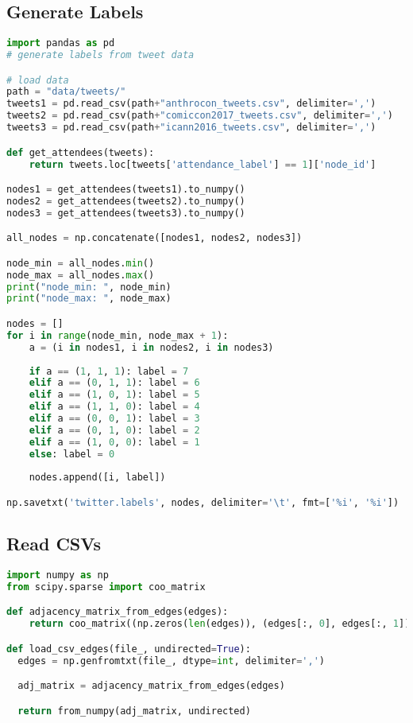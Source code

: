 \documentclass[sigconf, anonymous]{acmart}
\begin{document}
\subsection{Generate Labels}

\begin{lstlisting}[language=python]
import pandas as pd
# generate labels from tweet data

# load data
path = "data/tweets/"
tweets1 = pd.read_csv(path+"anthrocon_tweets.csv", delimiter=',')
tweets2 = pd.read_csv(path+"comiccon2017_tweets.csv", delimiter=',')
tweets3 = pd.read_csv(path+"icann2016_tweets.csv", delimiter=',')

def get_attendees(tweets):
    return tweets.loc[tweets['attendance_label'] == 1]['node_id']

nodes1 = get_attendees(tweets1).to_numpy()
nodes2 = get_attendees(tweets2).to_numpy()
nodes3 = get_attendees(tweets3).to_numpy()

all_nodes = np.concatenate([nodes1, nodes2, nodes3])

node_min = all_nodes.min()
node_max = all_nodes.max()
print("node_min: ", node_min)
print("node_max: ", node_max)

nodes = []
for i in range(node_min, node_max + 1):
    a = (i in nodes1, i in nodes2, i in nodes3)
    
    if a == (1, 1, 1): label = 7
    elif a == (0, 1, 1): label = 6
    elif a == (1, 0, 1): label = 5
    elif a == (1, 1, 0): label = 4
    elif a == (0, 0, 1): label = 3
    elif a == (0, 1, 0): label = 2
    elif a == (1, 0, 0): label = 1
    else: label = 0
    
    nodes.append([i, label])

np.savetxt('twitter.labels', nodes, delimiter='\t', fmt=['%i', '%i'])
\end{lstlisting}

\subsection{Read CSVs}

\begin{lstlisting}[language=python]
import numpy as np
from scipy.sparse import coo_matrix

def adjacency_matrix_from_edges(edges):
    return coo_matrix((np.zeros(len(edges)), (edges[:, 0], edges[:, 1])))

def load_csv_edges(file_, undirected=True):
  edges = np.genfromtxt(file_, dtype=int, delimiter=',')

  adj_matrix = adjacency_matrix_from_edges(edges)

  return from_numpy(adj_matrix, undirected)
\end{lstlisting}
\end{document}
